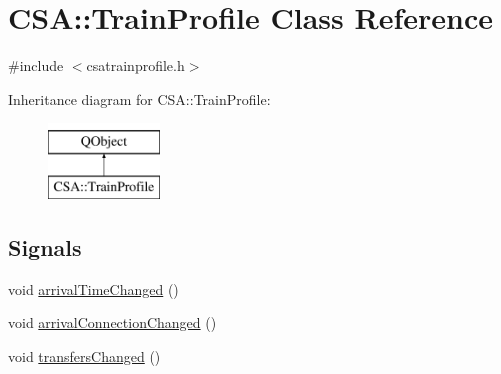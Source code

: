 \hypertarget{classCSA_1_1TrainProfile}{}\section{C\+SA\+:\+:Train\+Profile Class Reference}
\label{classCSA_1_1TrainProfile}


{\ttfamily \#include $<$csatrainprofile.\+h$>$}

Inheritance diagram for C\+SA\+:\+:Train\+Profile\+:\begin{figure}[H]
\begin{center}
\leavevmode
\includegraphics[height=2.000000cm]{classCSA_1_1TrainProfile}
\end{center}
\end{figure}
\subsection*{Signals}
\begin{DoxyCompactItemize}
\item 
void \mbox{\hyperlink{classCSA_1_1TrainProfile_a0acb40ad012f423a6312616ee7598265}{arrival\+Time\+Changed}} ()
\item 
void \mbox{\hyperlink{classCSA_1_1TrainProfile_ab5fdfaa36c183f15300d4c61286440e9}{arrival\+Connection\+Changed}} ()
\item 
void \mbox{\hyperlink{classCSA_1_1TrainProfile_aec2a0ddcf55785288eede5b45013a344}{transfers\+Changed}} ()
\end{DoxyCompactItemize}
